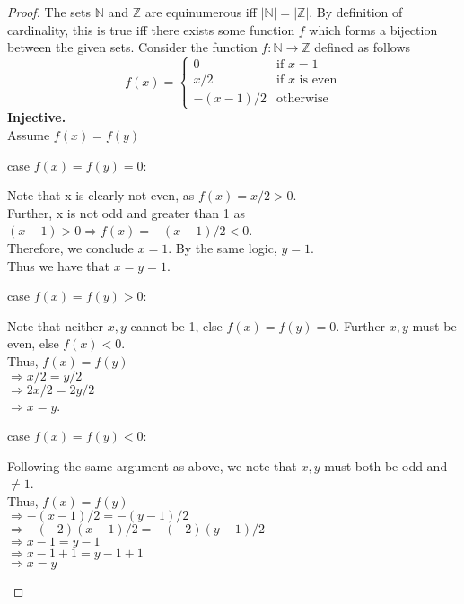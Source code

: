 \documentclass[12pt]{jhwhw}
\begin{document}
\solution
\begin{proof}
	
	The sets $\mathbb{N}$ and $\mathbb{Z}$ are equinumerous iff 
	$|\mathbb{N}| = |\mathbb{Z}|$. By definition of cardinality,
	this is true iff there exists some function $f$ which forms a bijection between
	the given sets.
	\bigbreak
	Consider the function $f: \mathbb{N} \rightarrow \mathbb{Z}$ defined as follows
	$$
		f(x) = 
		\begin{cases}
			0 & \text{if }x = 1 \\
			x/2 & \text{if $x$ is even} \\
			-(x-1)/2 & \text{otherwise}
		\end{cases}
	$$
	\bigbreak
	\textbf{Injective.} \\
	Assume $f(x) = f(y)$
	\bigbreak

	case $f(x) = f(y) = 0$:
	\begin{addmargin}{2em}
		Note that x is clearly not even, as $f(x) = x/2 > 0$. \\
		Further, x is not odd and greater than 1 as $(x-1) > 0 \Rightarrow f(x) = -(x-1)/2 < 0$. \\
		Therefore, we conclude $x = 1$.
		By the same logic, $y = 1$. \\
		Thus we have that $x = y = 1$.
	\end{addmargin}

	case $f(x) = f(y) > 0$:
	\begin{addmargin}{2em}
		Note that neither $x, y$ cannot be 1, else $f(x) = f(y) = 0$. Further $x, y$ must be even, else $f(x) < 0$. \\
		Thus, $f(x) = f(y)$ \\
		$\Rightarrow x/2 = y/2$ \\
		$\Rightarrow 2x/2 = 2y/2$ \\
		$\Rightarrow x = y$.
	\end{addmargin}

	case $f(x) = f(y) < 0$:
	\begin{addmargin}{2em}
		Following the same argument as above, we note that $x,y$ must both be odd and $\neq 1$. \\
		Thus, $f(x) = f(y)$ \\
		$\Rightarrow -(x-1)/2 = -(y-1)/2$ \\
		$\Rightarrow -(-2)(x-1)/2 = -(-2)(y-1)/2$ \\
		$\Rightarrow x-1 = y-1$ \\
		$\Rightarrow x-1+1 = y-1+1$ \\
		$\Rightarrow x = y$ \\
	\end{addmargin}


\end{proof}
\end{document}
